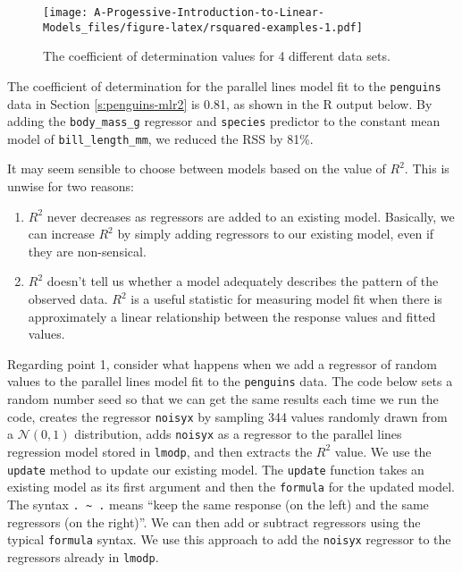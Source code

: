 \documentclass[
]{book}
\newenvironment{Shaded}{\begin{snugshade}}{\end{snugshade}}
\newcommand{\DocumentationTok}[1]{\textcolor[rgb]{0.56,0.35,0.01}{\textbf{\textit{#1}}}}
\newcommand{\FunctionTok}[1]{\textcolor[rgb]{0.00,0.00,0.00}{#1}}
\newcommand{\NormalTok}[1]{#1}
\newcommand{\SpecialCharTok}[1]{\textcolor[rgb]{0.00,0.00,0.00}{#1}}
\providecommand{\tightlist}{%
  \setlength{\itemsep}{0pt}\setlength{\parskip}{0pt}}
\theoremstyle{definition}
\theoremstyle{definition}
\theoremstyle{definition}
\theoremstyle{definition}
\theoremstyle{remark}
\begin{document}
\begin{figure}
\centering
\texttt{[image: A-Progessive-Introduction-to-Linear-Models\_files/figure-latex/rsquared-examples-1.pdf]}
\caption{\label{fig:rsquared-examples}The coefficient of determination values for 4 different data sets.}
\end{figure}

The coefficient of determination for the parallel lines model fit to the \texttt{penguins} data in Section \ref{s:penguins-mlr2} is 0.81, as shown in the R output below. By adding the \texttt{body\_mass\_g} regressor and \texttt{species} predictor to the constant mean model of \texttt{bill\_length\_mm}, we reduced the RSS by 81\%.

\begin{Shaded}
\end{Shaded}

It may seem sensible to choose between models based on the value of \(R^2\). This is unwise for two reasons:

\begin{enumerate}
\def\labelenumi{\arabic{enumi}.}
\tightlist
\item
  \(R^2\) never decreases as regressors are added to an existing model. Basically, we can increase \(R^2\) by simply adding regressors to our existing model, even if they are non-sensical.
\item
  \(R^2\) doesn't tell us whether a model adequately describes the pattern of the observed data. \(R^2\) is a useful statistic for measuring model fit when there is approximately a linear relationship between the response values and fitted values.
\end{enumerate}

Regarding point 1, consider what happens when we add a regressor of random values to the parallel lines model fit to the \texttt{penguins} data. The code below sets a random number seed so that we can get the same results each time we run the code, creates the regressor \texttt{noisyx} by sampling 344 values randomly drawn from a \(\mathcal{N}(0,1)\) distribution, adds \texttt{noisyx} as a regressor to the parallel lines regression model stored in \texttt{lmodp}, and then extracts the \(R^2\) value. We use the \texttt{update} method to update our existing model. The \texttt{update} function takes an existing model as its first argument and then the \texttt{formula} for the updated model. The syntax \texttt{.\ \textasciitilde{}\ .} means ``keep the same response (on the left) and the same regressors (on the right)''. We can then add or subtract regressors using the typical \texttt{formula} syntax. We use this approach to add the \texttt{noisyx} regressor to the regressors already in \texttt{lmodp}.
\end{document}
